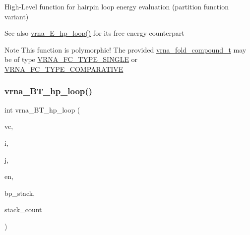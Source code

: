 High-\/\+Level function for hairpin loop energy evaluation (partition function variant) 

\begin{DoxySeeAlso}{See also}
\hyperlink{group__loops_ga999ba163a8148d72fd5f22819a681df7}{vrna\+\_\+\+E\+\_\+hp\+\_\+loop()} for it\textquotesingle{}s free energy counterpart
\end{DoxySeeAlso}
\begin{DoxyNote}{Note}
This function is polymorphic! The provided \hyperlink{group__fold__compound_ga1b0cef17fd40466cef5968eaeeff6166}{vrna\+\_\+fold\+\_\+compound\+\_\+t} may be of type \hyperlink{group__fold__compound_gga01a4ff86fa71deaaa5d1abbd95a1447da7e264dd3cf2dc9b6448caabcb7763cd6}{V\+R\+N\+A\+\_\+\+F\+C\+\_\+\+T\+Y\+P\+E\+\_\+\+S\+I\+N\+G\+LE} or \hyperlink{group__fold__compound_gga01a4ff86fa71deaaa5d1abbd95a1447dab821ce46ea3cf665be97df22a76f5023}{V\+R\+N\+A\+\_\+\+F\+C\+\_\+\+T\+Y\+P\+E\+\_\+\+C\+O\+M\+P\+A\+R\+A\+T\+I\+VE} 
\end{DoxyNote}
\mbox{\label{group__loops_ga6c4ba14d24f716d0ca9021771357e903}} 
\subsubsection{\texorpdfstring{vrna\+\_\+\+B\+T\+\_\+hp\+\_\+loop()}{vrna\_BT\_hp\_loop()}}
{\footnotesize\ttfamily int vrna\+\_\+\+B\+T\+\_\+hp\+\_\+loop (\begin{DoxyParamCaption}\item[{\hyperlink{group__fold__compound_ga1b0cef17fd40466cef5968eaeeff6166}{vrna\+\_\+fold\+\_\+compound\+\_\+t} $\ast$}]{vc,  }\item[{int}]{i,  }\item[{int}]{j,  }\item[{int}]{en,  }\item[{\hyperlink{group__data__structures_gaa651bda42e7692f08cb603cd6834b0ee}{vrna\+\_\+bp\+\_\+stack\+\_\+t} $\ast$}]{bp\+\_\+stack,  }\item[{int $\ast$}]{stack\+\_\+count }\end{DoxyParamCaption})}



